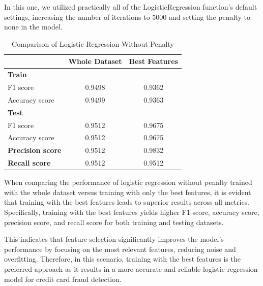 \documentclass[conference]{IEEEtran}
\begin{document}
In this one, we utilized practically all of the LogisticRegression function’s default settings, increasing the number of iterations to 5000 and setting the penalty to none in the model.

\begin{table}[htbp]
\centering
\begin{tabular}{@{}lcc@{}}
\toprule
 & \textbf{Whole Dataset} & \textbf{Best Features} \\ \midrule
\textbf{Train} &  &  \\
\quad F1 score & 0.9498 & 0.9362 \\
\quad Accuracy score & 0.9499 & 0.9363 \\
\textbf{Test} &  &  \\
\quad F1 score & 0.9512 & 0.9675 \\
\quad Accuracy score & 0.9512 & 0.9675 \\
\textbf{Precision score} & 0.9512 & 0.9832 \\
\textbf{Recall score} & 0.9512 & 0.9512 \\ \bottomrule
\end{tabular}
\caption{Comparison of Logistic Regression Without Penalty}
\label{tab:logistic-regression-comparison}
\end{table}

When comparing the performance of logistic regression without penalty trained with the whole dataset versus training with only the best features, it is evident that training with the best features leads to superior results across all metrics. Specifically, training with the best features yields higher F1 score, accuracy score, precision score, and recall score for both training and testing datasets.

This indicates that feature selection significantly improves the model's performance by focusing on the most relevant features, reducing noise and overfitting. Therefore, in this scenario, training with the best features is the preferred approach as it results in a more accurate and reliable logistic regression model for credit card fraud detection.
\end{document}
